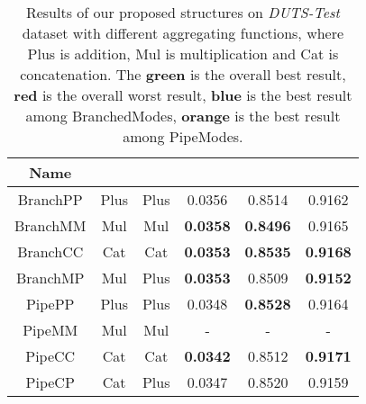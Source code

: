 \documentclass[10pt,twocolumn,letterpaper]{article}
\begin{document}
\begin{table}[t]
\begin{center}
\begin{tabular}{|c|c|c|c|c|c|}
\hline
Name &  &  &  &  &  \\
\hline\hline\rule{0pt}{2.2ex}
BranchPP & Plus & Plus & 0.0356 & 0.8514 & 0.9162 \\

BranchMM & Mul & Mul & \textcolor{mred}{\textbf{0.0358}} & \textcolor{mred}{\textbf{0.8496}} & 0.9165 \\

BranchCC & Cat & Cat & \textcolor{mblue}{\textbf{0.0353}} & \textcolor{mgreen}{\textbf{0.8535}} & \textcolor{mblue}{\textbf{0.9168}} \\

BranchMP & Mul & Plus & \textcolor{mblue}{\textbf{0.0353}} & 0.8509 & \textcolor{mred}{\textbf{0.9152}} \\

PipePP     & Plus & Plus & 0.0348 & \textcolor{morange}{\textbf{0.8528}} & 0.9164\\

PipeMM     & Mul & Mul & - & - & - \\

PipeCC     & Cat & Cat & \textcolor{mgreen}{\textbf{0.0342}} & 0.8512 & \textcolor{mgreen}{\textbf{0.9171}} \\

PipeCP     & Cat & Plus & 0.0347 & 0.8520 & 0.9159 \\
\hline
\end{tabular}
\end{center}
\caption{Results of our proposed structures on \textit{DUTS-Test} dataset with different aggregating functions, where Plus is addition, Mul is multiplication and Cat is concatenation. The \textcolor{mgreen}{\textbf{green}} is the overall best result, \textcolor{mred}{\textbf{red}} is the overall worst result,
\textcolor{mblue}{\textbf{blue}} is the best result among BranchedModes,
\textcolor{morange}{\textbf{orange}} is the best result among PipeModes.}
\label{tab:pipe_branch}
\end{table}
\end{document}
